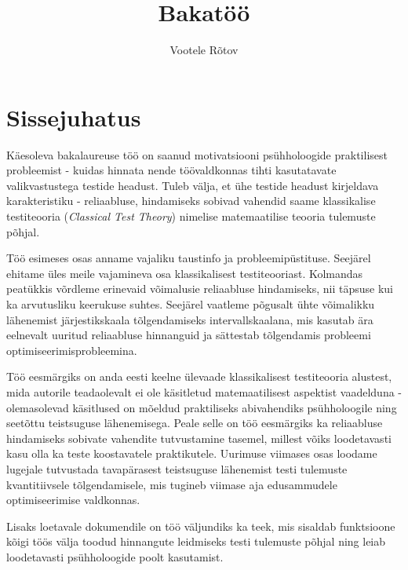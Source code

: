 \documentclass[a4paper,12pt]{article}
\author{Vootele Rõtov}
\title{Bakatöö}
\numberwithin{equation}{section}
\theoremstyle{definition}
\begin{document}
\maketitle

\pagebreak

\tableofcontents

\pagebreak

\section{Sissejuhatus}

Käesoleva bakalaureuse töö on saanud motivatsiooni psühholoogide praktilisest probleemist - kuidas hinnata nende töövaldkonnas tihti kasutatavate valikvastustega testide headust. Tuleb välja, et ühe testide headust kirjeldava karakteristiku - reliaabluse, hindamiseks sobivad vahendid saame klassikalise testiteooria (\textit{Classical Test Theory}) nimelise matemaatilise teooria tulemuste põhjal. 

Töö esimeses osas anname vajaliku taustinfo ja probleemipüstituse. Seejärel ehitame üles meile vajamineva osa klassikalisest testiteooriast. Kolmandas peatükkis võrdleme erinevaid võimalusie reliaabluse hindamiseks, nii täpsuse kui ka arvutusliku keerukuse suhtes. Seejärel vaatleme põgusalt ühte võimalikku lähenemist järjestikskaala tõlgendamiseks intervallskaalana, mis kasutab ära eelnevalt uuritud reliaabluse hinnanguid ja sättestab tõlgendamis probleemi optimiseerimisprobleemina.

Töö eesmärgiks on anda eesti keelne ülevaade klassikalisest testiteooria alustest, mida autorile teadaolevalt ei ole käsitletud matemaatilisest aspektist vaadelduna - olemasolevad käsitlused on mõeldud praktiliseks abivahendiks psühholoogile ning seetõttu teistsuguse lähenemisega. Peale selle on töö eesmärgiks ka reliaabluse hindamiseks sobivate vahendite tutvustamine tasemel, millest võiks loodetavasti kasu olla ka teste koostavatele praktikutele. Uurimuse viimases osas loodame lugejale tutvustada tavapärasest teistsuguse lähenemist testi tulemuste kvantitiivsele tõlgendamisele, mis tugineb viimase aja edusammudele optimiseerimise valdkonnas.


Lisaks loetavale dokumendile on töö väljundiks ka teek, mis sisaldab funktsioone kõigi töös välja toodud hinnangute leidmiseks testi tulemuste põhjal ning leiab loodetavasti psühholoogide poolt kasutamist. 


\pagebreak
\end{document}

